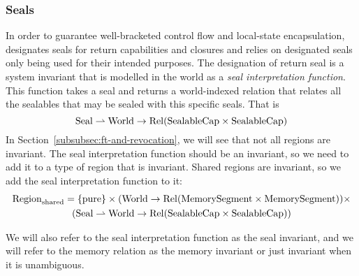 \begin{jversion}
\subsubsection{Seals}
\label{subsubsec:seals}
In order to guarantee well-bracketed control flow and local-state encapsulation, \stktokens{} designates seals for return capabilities and closures and relies on designated seals only being used for their intended purposes.
The designation of return seal is a system invariant that is modelled in the world as a \textit{seal interpretation function}.
This function takes a seal and returns a world-indexed relation that relates all the sealables that may be sealed with this specific seals.
That is
\[
  \mathrm{Seal} \rightharpoonup \mathrm{World} \rightarrow \mathrm{Rel}(\mathrm{SealableCap} \times \mathrm{SealableCap})
\]
In Section~\ref{subsubsec:ft-and-revocation}, we will see that not all regions are invariant.
The seal interpretation function should be an invariant, so we need to add it to a type of region that is invariant.
Shared regions are invariant, so we add the seal interpretation function to it:
\begin{multline*}
  \mathrm{Region}_\mathrm{shared} = 
  \{\mathrm{pure} \} \times (\mathrm{World} \rightarrow \mathrm{Rel}(\mathrm{MemorySegment}\times\mathrm{MemorySegment})) \times \\
  (\mathrm{Seal} \rightharpoonup \mathrm{World} \rightarrow \mathrm{Rel}(\mathrm{SealableCap} \times \mathrm{SealableCap}))
\end{multline*}

We will also refer to the seal interpretation function as the seal invariant, and we will refer to the memory relation as the memory invariant or just invariant when it is unambiguous.



\end{jversion}
